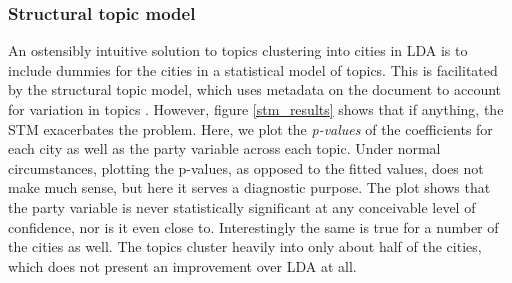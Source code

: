 \documentclass[11pt]{article}
\begin{document}
\subsubsection{Structural topic model}
An ostensibly intuitive solution to topics clustering into cities in LDA is to include dummies for the cities in a statistical model of topics. This is facilitated by the structural topic model, which uses metadata on the document to account for variation in topics \citep{Roberts2014}. However, figure \ref{stm_results} shows that if anything, the STM exacerbates the problem. Here, we plot the \textit{p-values} of the coefficients for each city as well as the party variable across each topic. Under normal circumstances, plotting the p-values, as opposed to the fitted values, does not make much sense, but here it serves a diagnostic purpose. The plot shows that the party variable is never statistically significant at any conceivable level of confidence, nor is it even close to. Interestingly the same is true for a number of the cities as well. The topics cluster heavily into only about half of the cities, which does not present an improvement over LDA at all.

\end{document}
